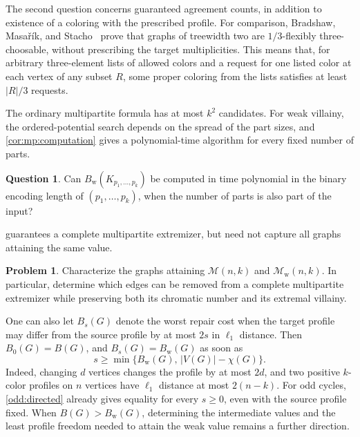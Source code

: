 \documentclass[11pt,reqno]{amsart}
\numberwithin{equation}{section}
\theoremstyle{definition}
\newtheorem{problem}[theorem]{Problem}
\newtheorem{question}[theorem]{Question}
\theoremstyle{remark}
\begin{document}
The second question concerns guaranteed agreement counts, in addition
to existence of a coloring with the prescribed profile. For comparison,
Bradshaw, Masa\v{r}\'ik, and Stacho~\cite{bradshaw2022} prove that
graphs of treewidth two are $1/3$-flexibly three-choosable, without
prescribing the target multiplicities. This means that, for arbitrary
three-element lists of allowed colors and a request for one listed
color at each vertex of any subset $R$, some proper coloring from the
lists satisfies at least $|R|/3$ requests.

The ordinary multipartite formula has at most $k^2$ candidates.
For weak villainy, the ordered-potential search depends on the
spread of the part sizes, and \cref{cor:mp:computation} gives a
polynomial-time algorithm for every fixed number of parts.

\begin{question}\label{question:weak-arithmetic}
Can $B_{\mathrm w}(K_{p_1,\ldots,p_k})$ be computed in time
polynomial in the binary encoding length of $(p_1,\ldots,p_k)$,
when the number of parts is also part of the input?
\end{question}

 guarantees a complete multipartite extremizer,
but need not capture all graphs attaining the same value.

\begin{problem}\label{problem:extremal-structure}
Characterize the graphs attaining $\mathcal M(n,k)$ and
$\mathcal M_{\mathrm w}(n,k)$. In particular, determine which edges
can be removed from a complete multipartite extremizer while preserving
both its chromatic number and its extremal villainy.
\end{problem}

One can also let $B_s(G)$ denote the worst repair cost when the target
profile may differ from the source profile by at most $2s$ in
$\ell_1$ distance. Then $B_0(G)=B(G)$, and $B_s(G)=B_{\mathrm w}(G)$
as soon as
\[
 s\ge\min\{B_{\mathrm w}(G),\,|V(G)|-\chi(G)\}.
\]
Indeed, changing $d$ vertices changes the profile by at most $2d$,
and two positive $k$-color profiles on $n$ vertices have
$\ell_1$ distance at most $2(n-k)$.
For odd cycles, \cref{odd:directed} already gives equality for every
$s\ge0$, even with the source profile fixed. When
$B(G)>B_{\mathrm w}(G)$, determining the intermediate values and the
least profile freedom needed to attain the weak value remains a
further direction.

\end{document}
